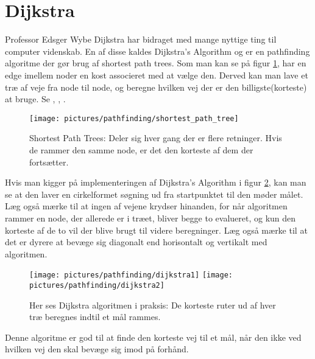 \section{Dijkstra}
Professor Edsger Wybe Dijkstra har bidraget med mange nyttige ting til computer videnskab. En af disse kaldes Dijkstra's Algorithm og er en pathfinding algoritme der gør brug af shortest path trees. Som man kan se på figur \ref{dia:shortest_path_trees}, har en edge imellem noder en kost associeret med at vælge den. Derved kan man lave et træ af veje fra node til node, og beregne hvilken vej der er den billigste(korteste) at bruge. Se \textcite[233]{buckland}, \textcite{amitastar}, \textcite[204]{MillingtonFunge}.

\begin{figure}
	\begin{center}
		\texttt{[image: pictures/pathfinding/shortest\_path\_tree]}
		\caption{Shortest Path Trees: Deler sig hver gang der er flere retninger. Hvis de rammer den samme node, er det den korteste af dem der fortsætter.}
		\label{dia:shortest_path_trees}
	\end{center}
\end{figure}

Hvis man kigger på implementeringen af Dijkstra's Algorithm i figur \ref{dia:dijkstra1}, kan man se at den laver en cirkelformet søgning ud fra startpunktet til den møder målet. Læg også mærke til at ingen af vejene krydser hinanden, for når algoritmen rammer en node, der allerede er i træet, bliver begge to evalueret, og kun den korteste af de to vil der blive brugt til videre beregninger. Læg også mærke til at det er dyrere at bevæge sig diagonalt end horisontalt og vertikalt med algoritmen.

\begin{figure}
	\begin{center}
		\texttt{[image: pictures/pathfinding/dijkstra1]}
		\texttt{[image: pictures/pathfinding/dijkstra2]}
		\caption{Her ses Dijkstra algoritmen i praksis: De korteste ruter ud af hver træ beregnes indtil et mål rammes.}
		\label{dia:dijkstra1}
	\end{center}
\end{figure}

Denne algoritme er god til at finde den korteste vej til et mål, når den ikke ved hvilken vej den skal bevæge sig imod på forhånd.

